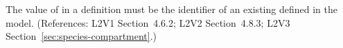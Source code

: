 The value of  in a \Species definition must be the
identifier of an existing \Compartment defined in the model.  (References:
L2V1 Section~4.6.2; L2V2 Section~4.8.3; L2V3 Section~\ref{sec:species-compartment}.)
